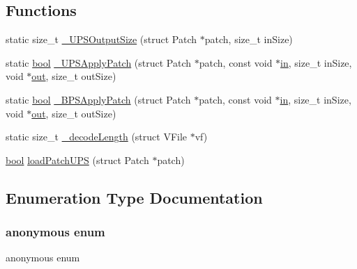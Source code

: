 \subsection*{Functions}
\begin{DoxyCompactItemize}
\item 
static size\+\_\+t \mbox{\hyperlink{patch-ups_8c_a4a463d2dc2f7681f226214c02a505619}{\+\_\+\+U\+P\+S\+Output\+Size}} (struct Patch $\ast$patch, size\+\_\+t in\+Size)
\item 
static \mbox{\hyperlink{libretro_8h_a4a26dcae73fb7e1528214a068aca317e}{bool}} \mbox{\hyperlink{patch-ups_8c_ab17c39f3fe7102519b7d704a8722237e}{\+\_\+\+U\+P\+S\+Apply\+Patch}} (struct Patch $\ast$patch, const void $\ast$\mbox{\hyperlink{gun_8c_a8bab68b4d22f69428207fabb60dc4f5c}{in}}, size\+\_\+t in\+Size, void $\ast$\mbox{\hyperlink{gun_8c_acb2d4658684492100bc328998f52ae82}{out}}, size\+\_\+t out\+Size)
\item 
static \mbox{\hyperlink{libretro_8h_a4a26dcae73fb7e1528214a068aca317e}{bool}} \mbox{\hyperlink{patch-ups_8c_afd9b5aebbeb07f9eb60a496daa6fe27f}{\+\_\+\+B\+P\+S\+Apply\+Patch}} (struct Patch $\ast$patch, const void $\ast$\mbox{\hyperlink{gun_8c_a8bab68b4d22f69428207fabb60dc4f5c}{in}}, size\+\_\+t in\+Size, void $\ast$\mbox{\hyperlink{gun_8c_acb2d4658684492100bc328998f52ae82}{out}}, size\+\_\+t out\+Size)
\item 
static size\+\_\+t \mbox{\hyperlink{patch-ups_8c_a44bc66fd8a8882bf88756a2e00a48af1}{\+\_\+decode\+Length}} (struct V\+File $\ast$vf)
\item 
\mbox{\hyperlink{libretro_8h_a4a26dcae73fb7e1528214a068aca317e}{bool}} \mbox{\hyperlink{patch-ups_8c_abf626a98cecfdfd5e6aa40bfa285e494}{load\+Patch\+U\+PS}} (struct Patch $\ast$patch)
\end{DoxyCompactItemize}


\subsection{Enumeration Type Documentation}
\mbox{\label{patch-ups_8c_af715e26dfffd1f8de1c18449e2770cff}} 
\subsubsection{\texorpdfstring{anonymous enum}{anonymous enum}}
{\footnotesize\ttfamily anonymous enum}

